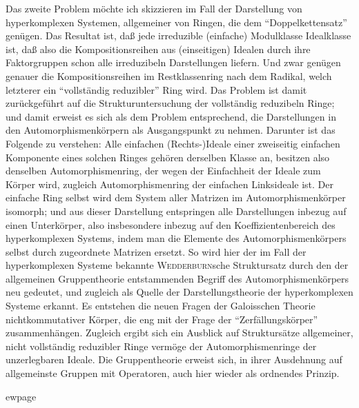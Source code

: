 \documentclass[12pt,a4paper]{article}
\theoremstyle{definition}
\begin{document}
Das zweite Problem m\"ochte ich skizzieren im Fall der Darstellung von
hyperkomplexen Systemen, allgemeiner von Ringen, die dem
``Doppelkettensatz'' gen\"ugen. Das Resultat ist, da\ss{} jede irreduzible
(einfache) Modulklasse Idealklasse ist, da\ss{} also die
Kompositionsreihen aus (einseitigen) Idealen durch ihre Faktorgruppen
schon alle irreduzibeln Darstellungen liefern. Und zwar gen\"ugen genauer
die Kompositionsreihen im Restklassenring nach dem Radikal, welch
letzterer ein ``vollst\"andig reduzibler'' Ring wird. Das Problem ist
damit zur\"uckgef\"uhrt auf die Strukturuntersuchung der vollst\"andig
reduzibeln Ringe; und damit erweist es sich als dem Problem
entsprechend, die Darstellungen in den Automorphismenk\"orpern als
Ausgangspunkt zu nehmen. Darunter ist das Folgende zu verstehen: Alle
einfachen (Rechts-)Ideale einer zweiseitig einfachen Komponente eines
solchen Ringes geh\"oren derselben Klasse an, besitzen also denselben
Automorphismenring, der wegen der Einfachheit der Ideale zum K\"orper
wird, zugleich Automorphismenring der einfachen Linksideale ist. Der
einfache Ring selbst wird dem System aller Matrizen im
Automorphismenk\"orper isomorph; und aus dieser Darstellung entspringen
alle Darstellungen inbezug auf einen Unterk\"orper, also insbesondere
inbezug auf den Koeffizientenbereich des hyperkomplexen Systems, indem
man die Elemente des Automorphismenk\"orpers selbst durch zugeordnete
Matrizen ersetzt. So wird hier der im Fall der hyperkomplexen Systeme
bekannte \textsc{Wedderburn}sche Struktursatz durch den der allgemeinen
Gruppentheorie entstammenden Begriff des Automorphismenk\"orpers neu
gedeutet, und zugleich als Quelle der Darstellungstheorie der
hyperkomplexen Systeme erkannt. Es entstehen die neuen Fragen der
Galoisschen Theorie nichtkommutativer K\"orper, die eng mit der Frage
der ``Zerf\"allungsk\"orper'' zusammenh\"angen. Zugleich ergibt sich ein
Ausblick auf Strukturs\"atze allgemeiner, nicht vollst\"andig reduzibler
Ringe verm\"oge der Automorphismenringe der unzerlegbaren Ideale. Die
Gruppentheorie erweist sich, in ihrer Ausdehnung auf allgemeinste
Gruppen mit Operatoren, auch hier wieder als ordnendes Prinzip.



ewpage
\setcounter{page}{577}

\end{document}
